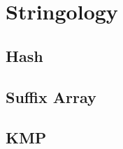 \documentclass[a4paper,10pt,twocolumn,oneside]{article}
\begin{document}
%

\section{Stringology}

\subsection{Hash}


\subsection{Suffix Array}


%

\subsection{KMP}


%

%

%

%

%
\end{document}
